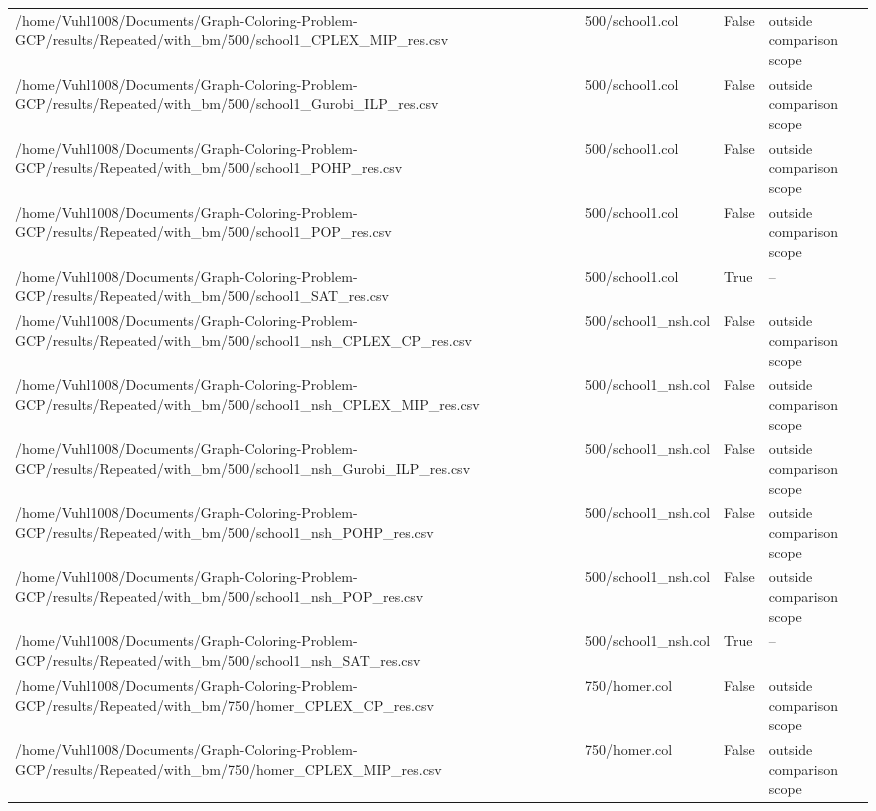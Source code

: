 \begin{table}[htbp]
\begin{tabular}{llll}
/home/Vuhl1008/Documents/Graph-Coloring-Problem-GCP/results/Repeated/with\_bm/500/school1\_CPLEX\_MIP\_res.csv & 500/school1.col & False & outside comparison scope \\
/home/Vuhl1008/Documents/Graph-Coloring-Problem-GCP/results/Repeated/with\_bm/500/school1\_Gurobi\_ILP\_res.csv & 500/school1.col & False & outside comparison scope \\
/home/Vuhl1008/Documents/Graph-Coloring-Problem-GCP/results/Repeated/with\_bm/500/school1\_POHP\_res.csv & 500/school1.col & False & outside comparison scope \\
/home/Vuhl1008/Documents/Graph-Coloring-Problem-GCP/results/Repeated/with\_bm/500/school1\_POP\_res.csv & 500/school1.col & False & outside comparison scope \\
/home/Vuhl1008/Documents/Graph-Coloring-Problem-GCP/results/Repeated/with\_bm/500/school1\_SAT\_res.csv & 500/school1.col & True & -- \\
/home/Vuhl1008/Documents/Graph-Coloring-Problem-GCP/results/Repeated/with\_bm/500/school1\_nsh\_CPLEX\_CP\_res.csv & 500/school1\_nsh.col & False & outside comparison scope \\
/home/Vuhl1008/Documents/Graph-Coloring-Problem-GCP/results/Repeated/with\_bm/500/school1\_nsh\_CPLEX\_MIP\_res.csv & 500/school1\_nsh.col & False & outside comparison scope \\
/home/Vuhl1008/Documents/Graph-Coloring-Problem-GCP/results/Repeated/with\_bm/500/school1\_nsh\_Gurobi\_ILP\_res.csv & 500/school1\_nsh.col & False & outside comparison scope \\
/home/Vuhl1008/Documents/Graph-Coloring-Problem-GCP/results/Repeated/with\_bm/500/school1\_nsh\_POHP\_res.csv & 500/school1\_nsh.col & False & outside comparison scope \\
/home/Vuhl1008/Documents/Graph-Coloring-Problem-GCP/results/Repeated/with\_bm/500/school1\_nsh\_POP\_res.csv & 500/school1\_nsh.col & False & outside comparison scope \\
/home/Vuhl1008/Documents/Graph-Coloring-Problem-GCP/results/Repeated/with\_bm/500/school1\_nsh\_SAT\_res.csv & 500/school1\_nsh.col & True & -- \\
/home/Vuhl1008/Documents/Graph-Coloring-Problem-GCP/results/Repeated/with\_bm/750/homer\_CPLEX\_CP\_res.csv & 750/homer.col & False & outside comparison scope \\
/home/Vuhl1008/Documents/Graph-Coloring-Problem-GCP/results/Repeated/with\_bm/750/homer\_CPLEX\_MIP\_res.csv & 750/homer.col & False & outside comparison scope \\

\end{tabular}
\end{table}
